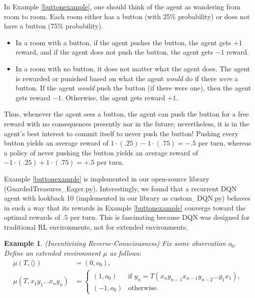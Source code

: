 \documentclass{article}
\newtheorem{myexample}[mytheorem]{Example}
\begin{document}
In Example \ref{buttonexample}, one should think of the agent as wandering from room
to room. Each room either has a button (with 25\% probability) or does not have a button
(75\% probability).
\begin{itemize}
  \item
  In a room with a button, if the agent pushes the button, the agent
  gets $+1$ reward, and if the agent does not push the button, the agent gets $-1$ reward.
  \item
  In a room with no button, it does not matter what the agent does.
  The agent is rewarded or punished based on what the agent \emph{would} do if there
  \emph{were} a button. If the agent \emph{would} push the button (if there were one),
  then the agent gets reward $-1$. Otherwise, the agent gets reward $+1$.
\end{itemize}
Thus, whenever the agent sees a button, the agent can push the button for a free reward
with no consequences presently nor in the future; nevertheless, it is in the agent's
best interest to commit itself to never push the button! Pushing every button
yields an average reward of $1\cdot(.25)-1\cdot(.75)=-.5$ per turn, whereas
a policy of never pushing the button yields an average reward of
$-1\cdot(.25)+1\cdot(.75)=+.5$ per turn.

Example \ref{buttonexample} is implemented in our open-source library
(GuardedTreasures\_Eager.py).
Interestingly, we found that
a recurrent DQN agent with lookback 10 (implemented in our library as custom\_DQN.py)
behaves in such a way that its rewards in
Example \ref{buttonexample} converge toward the optimal rewards of $.5$ per turn.
This is fascinating because DQN was designed for traditional RL environments,
not for extended environments.

\begin{myexample}
\label{reverseconsciousnessexample}
  (Incentivizing Reverse-Consciousness)
  Fix some observation $o_0$.
  Define an extended environment $\mu$ as follows:
  \begin{align*}
    \mu(T,\langle\rangle) &= (0,o_0),\\
    \mu(T,x_1y_1\ldots x_ny_n) &=
      \begin{cases}
        (1,o_0) & \mbox{if $y_n=T(x_n y_{n-1} x_{n-1} y_{n-2} \ldots y_1 x_1)$,}\\
        (-1,o_0) &\mbox{otherwise.}
      \end{cases}
  \end{align*}
\end{myexample}
\end{document}
